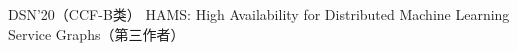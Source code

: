 \cvpub
{DSN'20（CCF-B类）} %
{HAMS: High Availability for Distributed Machine Learning Service Graphs（第三作者）} %
{} %
{} %
{ %
}
